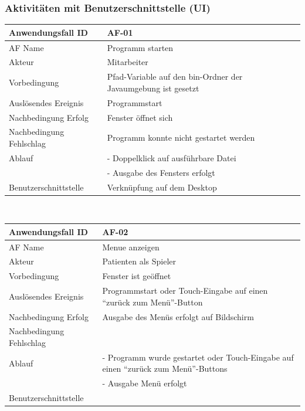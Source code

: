 \documentclass[12pt]{article}
\begin{document}
\subsubsection{Aktivitäten mit Benutzerschnittstelle (UI)}
\begin{tabularx}{\textwidth}{|l|X|} \hline
Anwendungsfall ID&AF-01\\ \hline
AF Name&Programm starten\\ \hline
Akteur&Mitarbeiter\\ \hline
Vorbedingung&Pfad-Variable auf den bin-Ordner der Javaumgebung ist gesetzt\\ \hline
Auslösendes Ereignis&Programmstart\\ \hline
Nachbedingung Erfolg&Fenster öffnet sich\\ \hline
Nachbedingung Fehlschlag&Programm konnte nicht gestartet werden\\ \hline
Ablauf&- Doppelklick auf ausführbare Datei\\&- Ausgabe des Fensters erfolgt \\ \hline
Benutzerschnittstelle&Verknüpfung auf dem Desktop\\ \hline
\end{tabularx}\\

\begin{tabularx}{\textwidth}{|l|X|} \hline
Anwendungsfall ID&AF-02\\ \hline
AF Name&Menue anzeigen\\ \hline
Akteur&Patienten als Spieler\\ \hline
Vorbedingung&Fenster ist geöffnet\\ \hline
Auslösendes Ereignis&Programmstart oder Touch-Eingabe auf einen "`zurück zum Menü"'-\Gls{Button}\\ \hline
Nachbedingung Erfolg&Ausgabe des Menüs erfolgt auf Bildschirm\\ \hline
Nachbedingung Fehlschlag& \\ \hline
Ablauf&- Programm wurde gestartet oder Touch-Eingabe auf einen "`zurück zum Menü"'-\Glspl{Button}\\&- Ausgabe Menü erfolgt \\ \hline
Benutzerschnittstelle& \\ \hline
\end{tabularx}\\
\end{document}
